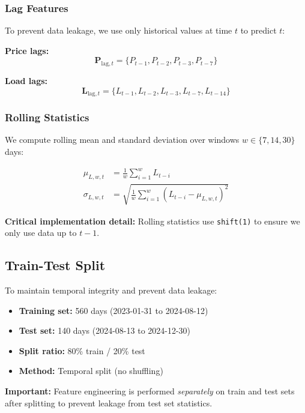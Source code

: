 \documentclass[11pt,a4paper]{article}
\begin{document}
\subsubsection{Lag Features}

To prevent data leakage, we use only historical values at time $t$ to predict $t$:

\textbf{Price lags:}
\begin{equation}
\mathbf{P}_{\text{lag},t} = \{P_{t-1}, P_{t-2}, P_{t-3}, P_{t-7}\}
\end{equation}

\textbf{Load lags:}
\begin{equation}
\mathbf{L}_{\text{lag},t} = \{L_{t-1}, L_{t-2}, L_{t-3}, L_{t-7}, L_{t-14}\}
\end{equation}

\subsubsection{Rolling Statistics}

We compute rolling mean and standard deviation over windows $w \in \{7, 14, 30\}$ days:

\begin{align}
\mu_{L,w,t} &= \frac{1}{w}\sum_{i=1}^{w} L_{t-i} \\
\sigma_{L,w,t} &= \sqrt{\frac{1}{w}\sum_{i=1}^{w} (L_{t-i} - \mu_{L,w,t})^2}
\end{align}

\textbf{Critical implementation detail:} Rolling statistics use \texttt{shift(1)} to ensure we only use data up to $t-1$.

\subsection{Train-Test Split}

To maintain temporal integrity and prevent data leakage:

\begin{itemize}
    \item \textbf{Training set:} 560 days (2023-01-31 to 2024-08-12)
    \item \textbf{Test set:} 140 days (2024-08-13 to 2024-12-30)
    \item \textbf{Split ratio:} 80\% train / 20\% test
    \item \textbf{Method:} Temporal split (no shuffling)
\end{itemize}

\textbf{Important:} Feature engineering is performed \emph{separately} on train and test sets after splitting to prevent leakage from test set statistics.
\end{document}
